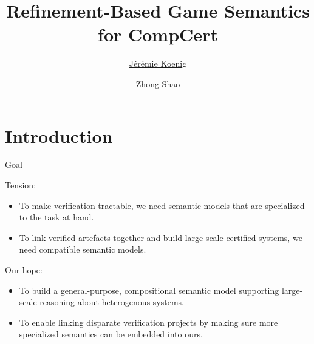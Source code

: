 \documentclass{beamer}
\title{Refinement-Based Game Semantics for CompCert}
\author{\underline{J\'er\'emie Koenig} \and Zhong Shao}
\begin{document}
\maketitle

\section{Introduction} %

\begin{frame}{Goal} %

Tension:
\begin{itemize}
\item
  To make verification tractable,
  we need semantic models that are
  specialized to the task at hand.
\item 
  To link verified artefacts together and
  build large-scale certified systems,
  we need compatible semantic models.
\end{itemize}
\vfill

Our hope:
\begin{itemize}
\item
  To build a general-purpose, compositional
  semantic model supporting large-scale reasoning
  about heterogenous systems.
\item
  To enable linking disparate verification projects
  by making sure more specialized semantics
  can be embedded into ours.
\end{itemize}
\vfill

\end{frame}
\end{document}
